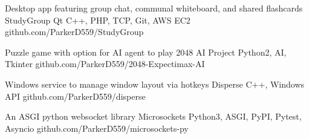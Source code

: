 \documentclass[]{awesome-cv}
\begin{document}
\begin{cventries}
	\cventry
	{Desktop app featuring group chat, communal whiteboard, and shared flashcards}
	{StudyGroup}
	{Qt C++, PHP, TCP, Git, AWS EC2}
	{github.com/ParkerD559/StudyGroup}
	{}

	\vspace{-5mm}
	\cventry
	{Puzzle game with option for AI agent to play}
	{2048 AI Project}
	{Python2, AI, Tkinter}
	{github.com/ParkerD559/2048-Expectimax-AI}
	{}

	\vspace{-5mm}
	\cventry
	{Windows service to manage window layout via hotkeys}
	{Disperse}
	{C++, Windows API}
	{github.com/ParkerD559/disperse}
	{}

	\vspace{-5mm}
	\cventry
	{An ASGI python websocket library}
	{Microsockets}
	{Python3, ASGI, PyPI, Pytest, Asyncio}
	{github.com/ParkerD559/microsockets-py}
	{}
	
	\vspace{-5mm}
\end{cventries}

\ 
\end{document}
